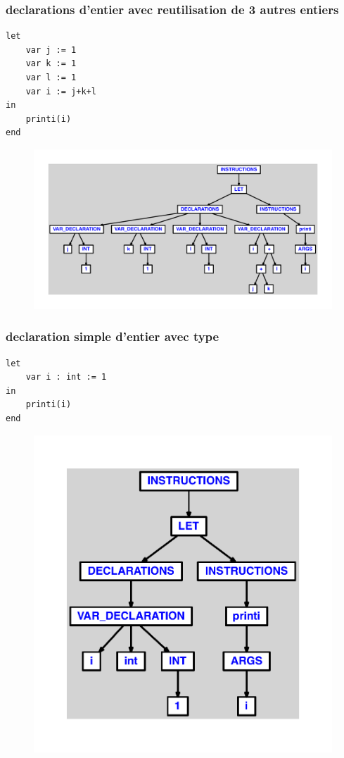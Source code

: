 \documentclass{article}
\begin{document}
\subsubsection{declarations d'entier avec reutilisation de 3 autres entiers}
\begin{lstlisting}
let
	var j := 1
	var k := 1
	var l := 1
	var i := j+k+l
in
	printi(i)
end
\end{lstlisting}
\newpage
\begin{figure}[H]
\centering
\includegraphics[max width=\textwidth]{ast/ast_305.pdf}
\end{figure}
\newpage
\subsubsection{declaration simple d'entier avec type}
\begin{lstlisting}
let
	var i : int := 1
in
	printi(i)
end
\end{lstlisting}
\newpage
\begin{figure}[H]
\centering
\includegraphics[max width=\textwidth]{ast/ast_306.pdf}
\end{figure}
\newpage
\end{document}
